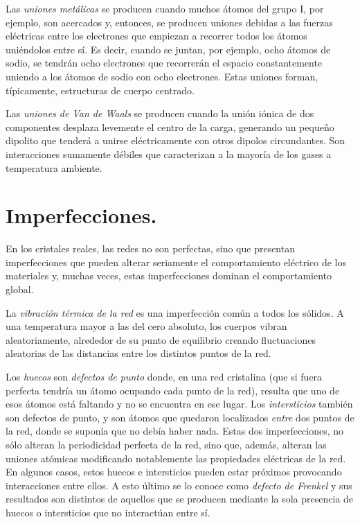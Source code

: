 \documentclass[12pt]{article}
\begin{document}
Las \emph{uniones metálicas} se producen cuando muchos átomos del grupo I, por ejemplo, son acercados y, entonces, se producen uniones debidas a las fuerzas eléctricas entre los electrones que empiezan a recorrer todos los átomos uniéndolos entre sí. Es decir, cuando se juntan, por ejemplo, ocho átomos de sodio, se tendrán ocho electrones que recorrerán el espacio constantemente uniendo a los átomos de sodio con ocho electrones. Estas uniones forman, típicamente, estructuras de cuerpo centrado.

Las \emph{uniones de Van de Waals} se producen cuando la unión iónica de dos componentes desplaza levemente el centro de la carga, generando un pequeño dipolito que tenderá a unirse eléctricamente con otros dipolos circundantes. Son interacciones sumamente débiles que caracterizan a la mayoría de los gases a temperatura ambiente.

\section{Imperfecciones.}

En los cristales reales, las redes no son perfectas, sino que presentan imperfecciones que pueden alterar seriamente el comportamiento eléctrico de los materiales y, muchas veces, estas imperfecciones dominan el comportamiento global.

La \emph{vibración térmica de la red} es una imperfección común a todos los sólidos. A una temperatura mayor a las del cero absoluto, los cuerpos vibran aleatoriamente, alrededor de su punto de equilibrio creando fluctuaciones aleatorias de las distancias entre los distintos puntos de la red.

Los \emph{huecos} son \emph{defectos de punto} donde, en una red cristalina (que si fuera perfecta tendría un átomo ocupando cada punto de la red), resulta que uno de esos átomos está faltando y no se encuentra en ese lugar. Los \emph{intersticios} también son defectos de punto, y son átomos que quedaron localizados \emph{entre} dos puntos de la red, donde se suponía que no debía haber nada. Estas dos imperfecciones, no sólo alteran la periodicidad perfecta de la red, sino que, además, alteran las uniones atómicas modificando notablemente las propiedades eléctricas de la red. En algunos casos, estos huecos e intersticios pueden estar próximos provocando interacciones entre ellos. A esto último se lo conoce como \emph{defecto de Frenkel} y sus resultados son distintos de aquellos que se producen mediante la sola presencia de huecos o intersticios que no interactúan entre sí.
\end{document}
